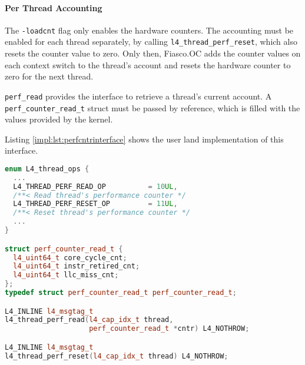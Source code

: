 \paragraph{Per Thread Accounting}
The \texttt{-loadcnt} flag only enables the hardware counters.
The accounting must be enabled for each thread separately, by calling
\texttt{l4\_thread\_perf\_reset}, which also resets the counter value to zero.
Only then, Fiasco.OC adds the counter values on each context switch to the
thread's account and resets the hardware counter to zero for the next thread.

\texttt{perf\_read} provides the interface to retrieve a thread's current
account.
A \texttt{perf\_counter\_read\_t} struct must be passed by reference, which
is filled with the values provided by the kernel.

Listing \ref{impl:lst:perfcntrinterface} shows the user land implementation of
this interface.

\begin{lstlisting}[language=c++,caption={User land interface for retrieving and
resetting a thread's performance counter},label={impl:lst:perfcntrinterface}]
enum L4_thread_ops {
  ...
  L4_THREAD_PERF_READ_OP	      = 10UL,
  /**< Read thread's performance counter */
  L4_THREAD_PERF_RESET_OP	      =	11UL,
  /**< Reset thread's performance counter */
  ...
}

struct perf_counter_read_t {
  l4_uint64_t core_cycle_cnt;
  l4_uint64_t instr_retired_cnt;
  l4_uint64_t llc_miss_cnt;
};
typedef struct perf_counter_read_t perf_counter_read_t;

L4_INLINE l4_msgtag_t
l4_thread_perf_read(l4_cap_idx_t thread,
                    perf_counter_read_t *cntr) L4_NOTHROW;

L4_INLINE l4_msgtag_t
l4_thread_perf_reset(l4_cap_idx_t thread) L4_NOTHROW;
\end{lstlisting}
